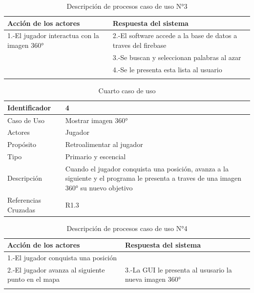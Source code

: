 \begin{longtable}[H]{| m{8cm} | m{8cm} |}
\hline 
\textbf{Acción de los actores} & \textbf{Respuesta del sistema}\\
\hline 
1.-El jugador interactua con la imagen 360° & 2.-El software accede a la base de datos a traves del firebase\\
\hline
& 3.-Se buscan y seleccionan palabras al azar\\
\hline
& 4.-Se le presenta esta lista al usuario\\
\hline
\caption{Descripción de procesos caso de uso N°3}
\end{longtable}

\begin{table}[H]
    \begin{center}
        \begin{tabular}{| l | m{12cm} |}        
        	\hline 
        	Identificador & 4\\
        	\hline
        	Caso de Uso & Mostrar imagen 360°\\
        	\hline
        	Actores & Jugador\\
        	\hline
        	Propósito & Retroalimentar al jugador \\
        	\hline
        	Tipo & Primario y escencial\\
        	\hline
        	Descripción & Cuando el jugador conquista una posición, avanza a la siguiente y el programa le presenta a traves de una imagen 360° su nuevo objetivo\\
        	\hline
        	Referencias Cruzadas & R1.3\\
        	\hline
        \end{tabular}
    \caption{Cuarto caso de uso}
    \label{Caso_de_uso_4}
    \end{center}
\end{table}

\begin{longtable}[H]{| m{8cm} | m{8cm} |}
\hline 
\textbf{Acción de los actores} & \textbf{Respuesta del sistema}\\
\hline 
1.-El jugador conquista una posición & \\
\hline
2.-El jugador avanza al siguiente punto en el mapa & 3.-La GUI le presenta al ususario la nueva imagen 360°\\
\hline 
\caption{Descripción de procesos caso de uso N°4}
\end{longtable}

